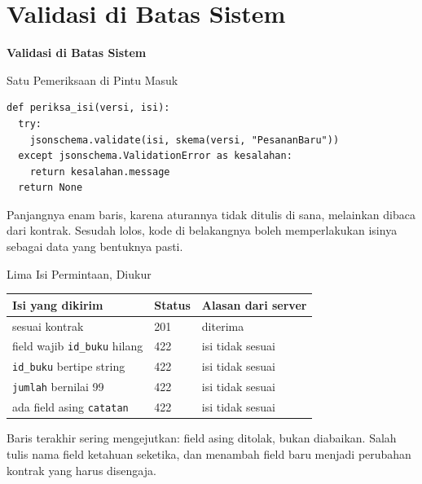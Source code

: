 \documentclass[aspectratio=169, table, 12pt]{beamer}
\begin{document}
\section{Validasi di Batas Sistem}

\begin{frame}{\hfill}
  \centering
  \Huge{\textbf{Validasi di Batas Sistem}}
\end{frame}

\begin{frame}[fragile]{{\Large Satu Pemeriksaan di Pintu Masuk}}
  \vspace{2pt}
\begin{lstlisting}[style=PythonStyle]
def periksa_isi(versi, isi):
  try:
    jsonschema.validate(isi, skema(versi, "PesananBaru"))
  except jsonschema.ValidationError as kesalahan:
    return kesalahan.message
  return None
\end{lstlisting}
  \vspace{2pt}
  {\small Panjangnya enam baris, karena aturannya tidak ditulis di sana,
  melainkan dibaca dari kontrak. Sesudah lolos, kode di belakangnya boleh
  memperlakukan isinya sebagai data yang bentuknya pasti.}
\end{frame}

\begin{frame}{{\Large Lima Isi Permintaan, Diukur}}
  \vspace{6pt}
  \centering
  {\footnotesize
  \begin{tabularx}{\textwidth}{Yll}
    \hline
    \textbf{Isi yang dikirim} & \textbf{Status} & \textbf{Alasan dari server} \\
    \hline
    sesuai kontrak & 201 & diterima \\
    \hline
    field wajib \texttt{id\_buku} hilang & 422 & isi tidak sesuai \\
    \hline
    \texttt{id\_buku} bertipe string & 422 & isi tidak sesuai \\
    \hline
    \texttt{jumlah} bernilai 99 & 422 & isi tidak sesuai \\
    \hline
    ada field asing \texttt{catatan} & 422 & isi tidak sesuai \\
    \hline
  \end{tabularx}}

  \vspace{6pt}
  {\small Baris terakhir sering mengejutkan: field asing ditolak, bukan
  diabaikan. Salah tulis nama field ketahuan seketika, dan menambah field
  baru menjadi perubahan kontrak yang harus disengaja.}
\end{frame}
\end{document}
